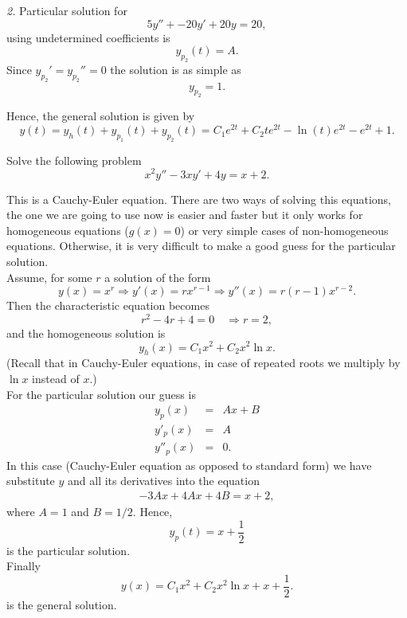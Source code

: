 \documentclass[11pt]{article}
\begin{document}
\begin{solution}
\par \textsl{2.} Particular solution for
\[5y'' + -20 y' +20 y = 20,\] using undetermined coefficients is
\begin{equation*}
     y_{p_{2}}(t)=A.
\end{equation*}
Since $y_{p_{2}}'=y_{p_{2}}''=0$ the solution is as simple as \[y_{p_{2}}=1.\]

Hence, the general solution is given by
\begin{equation*}
\boxed{y(t) = y_{h}(t) + y_{p_{1}}(t) + y_{p_{2}}(t) =C_{1}e^{2t}+C_{2}te^{2t} -\ln (t)e^{2t} - e^{2t} + 1 }.
\end{equation*}
\end{solution}





\begin{problem}
Solve the following problem
\begin{equation*}
     x^{2}y''-3xy'+4y=x+2.
\end{equation*}
\end{problem}
\begin{solution}
This is a Cauchy-Euler equation. There are two ways of solving this equations, the one we are going to use now is easier and faster but it only works for homogeneous equations ($g(x)=0$) or very simple cases of non-homogeneous equations. Otherwise, it is very difficult to make a good guess for the particular solution.\\
Assume, for some $r$ a solution of the form 
\[y(x)=x^{r}\Rightarrow y'(x)=rx^{r-1}\Rightarrow y''(x)=r(r-1)x^{r-2}.\]
Then the characteristic equation becomes
\[r^{2}-4r+4=0 \quad \Rightarrow r = 2,\]
and the homogeneous solution is
\[y_{h}(x)=C_{1}x^{2}+C_{2}x^{2}\ln x.\]
(Recall that in Cauchy-Euler equations, in case of repeated roots we multiply by $\ln x$ instead of $x$.)\\
For the particular solution our guess is
\begin{eqnarray*}
y_{p}(x) & = & Ax + B \\
y'_{p}(x) & = & A \\
y''_{p}(x) & = & 0.
\end{eqnarray*}
In this case (Cauchy-Euler equation as opposed to standard form) we have substitute $y$ and all its derivatives into the equation 
\begin{equation*} \begin{split}
 -3Ax + 4 A x +4B = x+2,
\end{split}
\end{equation*}
where $A=1$ and $B =1/2$. Hence, 
$$y_{p}(t) = x + \frac{1}{2}$$ 
is the particular solution.\\
Finally 
\[\boxed{y(x)=C_{1} x^{2}+ C_{2}x^{2}\ln x + x +\frac{1}{2}}.\]
is the general solution.
\end{solution}
\end{document}
